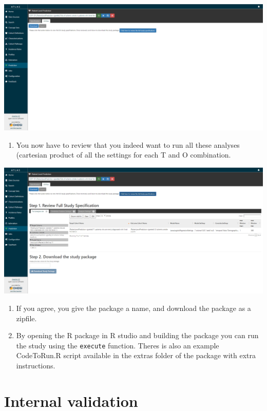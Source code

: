 \documentclass[]{book}
\providecommand{\tightlist}{%
  \setlength{\itemsep}{0pt}\setlength{\parskip}{0pt}}
\begin{document}
\includegraphics{images/PatientLevelPrediction/atlasdownload1.png}

\begin{enumerate}
\def\labelenumi{\arabic{enumi}.}
\setcounter{enumi}{1}
\tightlist
\item
  You now have to review that you indeed want to run all these analyses
  (cartesian product of all the settings for each T and O combination.
\end{enumerate}

\includegraphics{images/PatientLevelPrediction/atlasdownload2.png}

\begin{enumerate}
\def\labelenumi{\arabic{enumi}.}
\setcounter{enumi}{2}
\item
  If you agree, you give the package a name, and download the package as
  a zipfile.
\item
  By opening the R package in R studio and building the package you can
  run the study using the \texttt{execute} function. Theres is also an
  example CodeToRun.R script available in the extras folder of the
  package with extra instructions.
\end{enumerate}

\section{Internal validation}\label{internal-validation}
\end{document}
